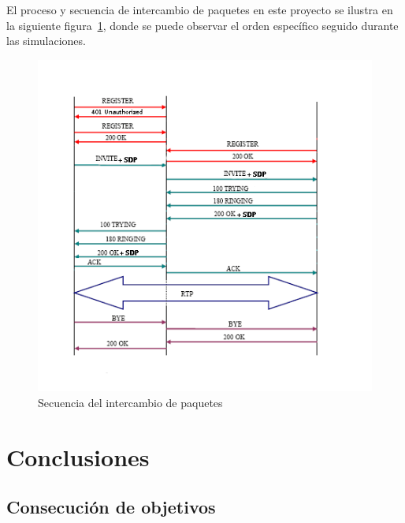 \documentclass[a4paper, 12pt]{book}
\begin{document}
El proceso y secuencia de intercambio de paquetes en este proyecto se ilustra en la siguiente figura~\ref{fig:Secuencia_Paquetes}, donde se puede observar el orden 
específico seguido durante las simulaciones.


\begin{figure}
  \centering
  \includegraphics[width=18cm, keepaspectratio]{img/resultados/Secuencia_Paquetes.png}
  \caption{Secuencia del intercambio de paquetes}
  \label{fig:Secuencia_Paquetes}
\end{figure}


\cleardoublepage
\chapter{Conclusiones}
\label{chap:conclusiones}


\section{Consecución de objetivos}
\label{sec:consecucion-objetivos}
\end{document}
